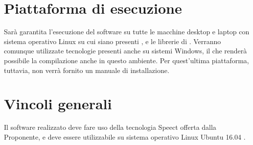 \documentclass[../AnalisideiRequisiti.tex]{subfiles}
\begin{document}
\section{Piattaforma di esecuzione}
Sarà garantita l'esecuzione del software su tutte le macchine desktop e laptop con sistema operativo Linux su cui siano presenti ,  e le librerie di . Verranno comunque utilizzate tecnologie presenti anche su sistemi Windows, il che renderà possibile la compilazione anche in questo ambiente. Per quest'ultima piattaforma, tuttavia, non verrà fornito un manuale di installazione.

\section{Vincoli generali}
Il software realizzato deve fare uso della tecnologia Speect offerta dalla Proponente, e deve essere utilizzabile su sistema operativo Linux Ubuntu 16.04 .
\end{document}

